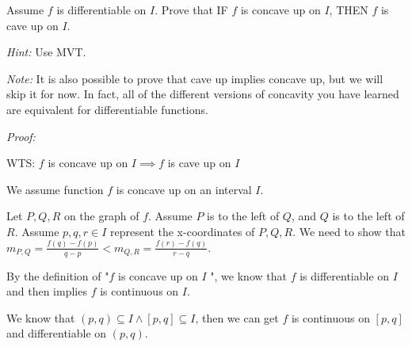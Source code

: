 \documentclass[12pt]{exam}
\newcommand{\vv}{\vspace{.1cm}}
\begin{document}
\begin{enumerate}
 Assume $f$ is differentiable on $I$. 
		Prove that IF $f$ is concave up on $I$, THEN $f$ is cave up on $I$.


\emph{Hint:}  Use MVT.

\emph{Note:}  It is also possible to prove that cave up implies concave up, but we will skip it for now.  In fact, all of the different versions of concavity you have learned are equivalent for differentiable functions.	

\vv

\emph{Proof:}

\vv

WTS: $f$ is concave up on $I \implies f$ is cave up on $I$



We assume function $f$ is concave up on an interval $I$.

Let $P, Q, R$ on the graph of $f$. Assume $P$ is to the left of $Q$, and $Q$ is to the left of $R$. Assume $p, q, r \in I$ represent the x-coordinates of $P, Q, R$.
We need to show that $m_{P,Q}=\frac{f(q)-f(p)}{q-p}<m_{Q,R}=\frac{f(r)-f(q)}{r-q}$.

By the definition of "$f$ is concave up on $I$ ", we know that $f$ is differentiable on $I$ and then implies $f$ is continuous on $I$.

We know that $(p,q)\subseteq I \land [p,q]\subseteq I$, then we can get $f$ is continuous on $[p,q]$ and differentiable on $(p,q)$.


\end{enumerate}
\end{document}
